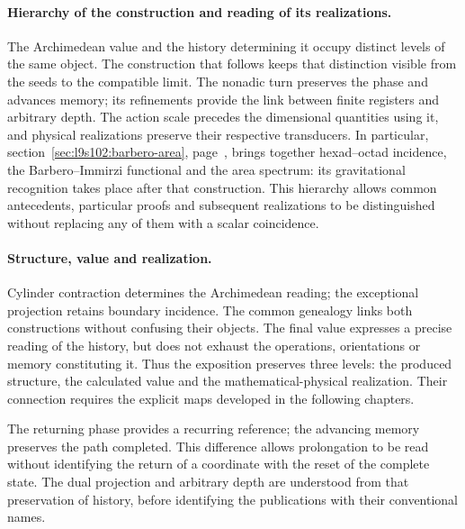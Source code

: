 \paragraph{Hierarchy of the construction and reading of its realizations.}
The Archimedean value and the history determining it occupy distinct
levels of the same object. The construction that follows keeps that
distinction visible from the seeds to the compatible limit. The nonadic
turn preserves the phase and advances memory; its refinements provide
the link between finite registers and arbitrary depth.
The action scale precedes the dimensional quantities using it,
and physical realizations preserve their respective transducers.
In particular, section~\ref{sec:l9s102:barbero-area},
page~\pageref{sec:l9s102:barbero-area}, brings together hexad--octad
incidence, the Barbero--Immirzi functional and the area spectrum:
its gravitational recognition takes place after that construction.
This hierarchy allows common antecedents, particular
proofs and subsequent realizations to be distinguished without replacing
any of them with a scalar coincidence.

\paragraph{Structure, value and realization.}
Cylinder contraction determines the Archimedean reading; the
exceptional projection retains boundary incidence. The common
genealogy links both constructions without confusing their objects. The final value
expresses a precise reading of the history, but does not exhaust the operations,
orientations or memory constituting it. Thus the exposition
preserves three levels: the produced structure, the calculated value and the
mathematical-physical realization. Their connection requires the explicit maps
developed in the following chapters.

The returning phase provides a recurring reference; the advancing
memory preserves the path completed. This difference allows prolongation
to be read without identifying the return of a coordinate with the reset
of the complete state. The dual projection and arbitrary depth are
understood from that preservation of history, before identifying the
publications with their conventional names.

